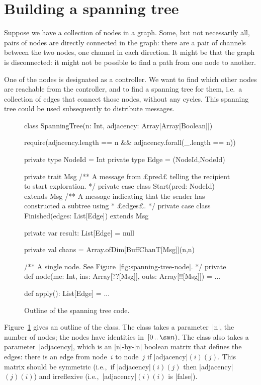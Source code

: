 \section{Building a spanning tree}

Suppose we have a collection of nodes in a graph.  Some, but not necessarily
all, pairs of nodes are directly connected in the graph: there are a pair of
channels between the two nodes, one channel in each direction.  It might be
that the graph is disconnected: it might not be possible to find a path from
one node to another.

One of the nodes is designated as a controller.  We want to find which other
nodes are reachable from the controller, and to find a spanning tree for them,
i.e.~a collection of edges that connect those nodes, without any cycles.  This
spanning tree could be used subsequently to distribute messages.


\begin{figure}[tbh]
\begin{scala}
class SpanningTree(n: Int, adjacency: Array[Array[Boolean]]){
  require(adjacency.length == n && adjacency.forall(_.length == n))

  private type NodeId = Int
  private type Edge = (NodeId,NodeId)

  private trait Msg
  /** A message from £pred£ telling the recipient to start exploration. */
  private case class Start(pred: NodeId) extends Msg
  /** A message indicating that the sender has constructed a subtree using
    * £edges£. */
  private case class Finished(edges: List[Edge]) extends Msg

  private var result: List[Edge] = null

  private val chans = Array.ofDim[BuffChanT[Msg]](n,n)

  /** A single node.  See Figure~\ref{fig:spanning-tree-node}. */
  private def node(me: Int, ins: Array[??[Msg]], outs: Array[!![Msg]]) = ...

  def apply(): List[Edge] = ...
}
\end{scala}
\caption{Outline of the spanning tree code.}
\label{fig:spanning-tree}
\end{figure}


Figure~\ref{fig:spanning-tree} gives an outline of the class.  The class takes
a parameter~|n|, the number of nodes; the nodes have identities
in~$\interval{0}{\sm n}$.  The class also takes a parameter~|adjacency|, which
is an |n|-by-|n| boolean matrix that defines the edges: there is an edge from
node~$i$ to node~$j$ if |adjacency|$(i)(j)$.  This matrix should be symmetric
(i.e.,~if |adjacency|$(i)(j)$ then |adjacency|$(j)(i)$) and irreflexive
(i.e.,~|adjacency|$(i)(i)$ is |false|).

